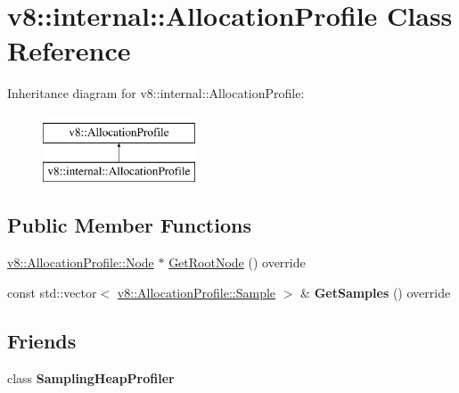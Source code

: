 \hypertarget{classv8_1_1internal_1_1AllocationProfile}{}\section{v8\+:\+:internal\+:\+:Allocation\+Profile Class Reference}
\label{classv8_1_1internal_1_1AllocationProfile}
Inheritance diagram for v8\+:\+:internal\+:\+:Allocation\+Profile\+:\begin{figure}[H]
\begin{center}
\leavevmode
\includegraphics[height=2.000000cm]{classv8_1_1internal_1_1AllocationProfile}
\end{center}
\end{figure}
\subsection*{Public Member Functions}
\begin{DoxyCompactItemize}
\item 
\mbox{\hyperlink{structv8_1_1AllocationProfile_1_1Node}{v8\+::\+Allocation\+Profile\+::\+Node}} $\ast$ \mbox{\hyperlink{classv8_1_1internal_1_1AllocationProfile_abb93406eaccd8b37de3e080d0620bc2b}{Get\+Root\+Node}} () override
\item 
\mbox{\label{classv8_1_1internal_1_1AllocationProfile_acbcf0c0cabf7c8d773e2cb27af6d0008}} 
const std\+::vector$<$ \mbox{\hyperlink{structv8_1_1AllocationProfile_1_1Sample}{v8\+::\+Allocation\+Profile\+::\+Sample}} $>$ \& {\bfseries Get\+Samples} () override
\end{DoxyCompactItemize}
\subsection*{Friends}
\begin{DoxyCompactItemize}
\item 
\mbox{\label{classv8_1_1internal_1_1AllocationProfile_a1c4268235229c6a40ca92cbcd4591c9b}} 
class {\bfseries Sampling\+Heap\+Profiler}
\end{DoxyCompactItemize}
